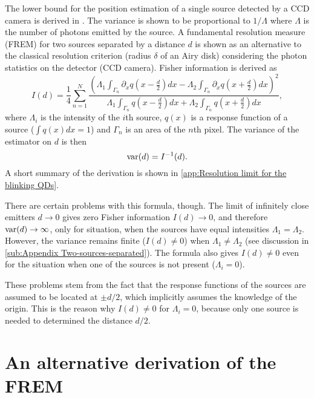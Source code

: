 The \CR lower bound for the position estimation of a single source detected by a CCD camera is derived in \cite{Ram2006,Ram2006b}. The variance is shown to be proportional to $1/\Lambda$ where $\Lambda$ is the number of photons emitted by the source. A fundamental resolution measure (FREM) for two sources separated by a distance $d$ is shown as an alternative to the classical resolution criterion (radius $\delta$ of an Airy disk) considering the photon statistics on the detector (CCD camera). Fisher information is derived as
%
\begin{equation}
	I(d)=\frac{1}{4}\sum_{n=1}^N\frac{\left(\Lambda_1\int_{\Gamma_n}\partial_xq(x-\frac{d}{2})dx-\Lambda_2\int_{\Gamma_n}\partial_xq(x+\frac{d}{2})dx\right)^2}{\Lambda_1\int_{\Gamma_n}q(x-\frac{d}{2})dx+\Lambda_2\int_{\Gamma_n}q(x+\frac{d}{2})dx},
	\label{eq:Ram FREM}
\end{equation}
%
where $\Lambda_i$ is the intensity of the $i$th source, $q(x)$ is a response function of a source ($\int q(x)dx=1$) and $\Gamma_n$ is an area of the $n$th pixel. The variance of the estimator on $d$ is then 
%
\begin{equation}
	\mathrm{var}(d)=I^{-1}(d).
\end{equation}
%
A short summary of the derivation is shown in \autoref{app:Resolution limit for the blinking QDs}. 

There are certain problems with this formula, though. The limit of infinitely close emitters $d\rightarrow0$ gives  zero Fisher information $I(d)\rightarrow0$, and therefore $\mathrm{var}(d)\rightarrow\infty$, only for situation, when the sources have equal intensities $\Lambda_1=\Lambda_2$. However, the variance remains finite ($I(d)\neq0$) when $\Lambda_1\neq\Lambda_2$ (see discussion in \autoref{sub:Appendix Two-sources-separated}). The formula also gives $I(d)\neq0$ even for the situation when one of the sources is not present ($\Lambda_i=0$). 

These problems stem from the fact that the response functions of the sources are assumed to be located at $\pm d/2$, which implicitly assumes the knowledge of the origin. This is the reason why $I(d)\neq0$ for $\Lambda_i=0$, because only one source is needed to determined the distance $d/2$. 


\section{An alternative derivation of the FREM\label{sub:An-alternative-derivation-FREM}} 


